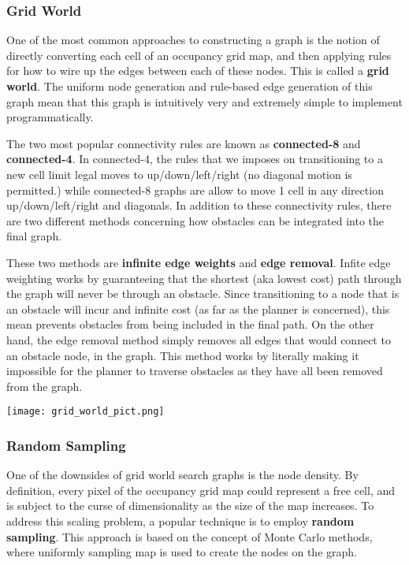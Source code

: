 \subsubsection{Grid World}
One of the most common approaches to constructing a graph is the notion of directly converting each cell of an occupancy grid map, and then applying rules for how to wire up the edges between each of these nodes. This is called a \textbf{grid world}. The uniform node generation and rule-based edge generation of this graph mean that this graph is intuitively very and extremely simple to implement programmatically.

The two most popular connectivity rules are known as \textbf{connected-8} and \textbf{connected-4}. In connected-4, the rules that we imposes on transitioning to a new cell limit legal moves to up/down/left/right (no diagonal motion is permitted.) while connected-8 graphs are allow to move 1 cell in any direction up/down/left/right and diagonals. In addition to these connectivity rules, there are two different methods concerning how obstacles can be integrated into the final graph. 

These two methods are \textbf{infinite edge weights} and \textbf{edge removal}. Infite edge weighting works by guaranteeing that the shortest (aka lowest cost) path through the graph will never be through an obstacle. Since transitioning to a node that is an obstacle will incur and infinite cost (as far as the planner is concerned), this mean prevents obstacles from being included in the final path. On the other hand, the edge removal method simply removes all edges that would connect to an obstacle node, in the graph. This method works by literally making it impossible for the planner to traverse obstacles as they have all been removed from the graph.

\texttt{[image: grid\_world\_pict.png]}





\subsubsection{Random Sampling}

One of the downsides of grid world search graphs is the node density. By definition, every pixel of the occupancy grid map could represent a free cell, and is subject to the curse of dimensionality as the size of the map increases. To address this scaling problem, a popular technique is to employ \textbf{random sampling}. This approach is based on the concept of Monte Carlo methods, where uniformly sampling map is used to create the nodes on the graph. 

